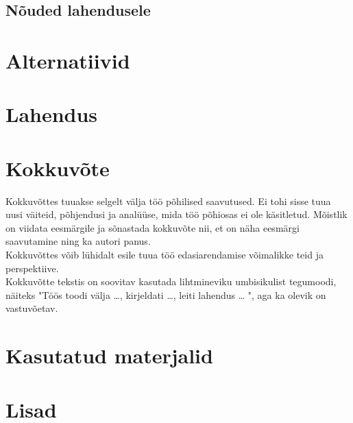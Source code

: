 \documentclass[12pt]{report}
\begin{document}
  
  \subsection{Nõuded lahendusele}
  
  \newpage
  
  \section{Alternatiivid}
  
  \newpage
  
  \section{Lahendus}
  
  \newpage
  
  \section*{Kokkuvõte}
  \label{kokkuvote}

Kokkuvõttes tuuakse selgelt välja töö põhilised saavutused. Ei tohi sisse tuua uusi väiteid, põhjendusi ja analüüse, mida töö põhiosas ei ole käsitletud. Mõistlik on viidata eesmärgile ja sõnastada kokkuvõte nii, et on näha eesmärgi saavutamine ning ka autori panus.\\

Kokkuvõttes võib lühidalt esile tuua töö edasiarendamise võimalikke teid ja perspektiive.\\

Kokkuvõtte tekstis on soovitav kasutada lihtmineviku umbisikulist tegumoodi, näiteks "Töös toodi välja …, kirjeldati …, leiti lahendus … ", aga ka olevik on vastuvõetav.

  \newpage
  
  \section*{Kasutatud materjalid}
  \label{kasutatud-materjalid}

  \newpage
  
  \section*{Lisad}
  \label{lisad}
\end{document}
